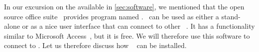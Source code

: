 %
%
%
In our excursion on the available  in \cref{sec:software}, we mentioned that the open source office suite \libreoffice\ provides program named \libreofficeBase.
\libreofficeBase\ can be used as either a stand-alone  or as a nice user interface that can connect to other ~\cite{FNFHWSKLSSGLFRSRPLJG2022BG7R1BOL7C,S2022L7PFEUU}.
It has a functionality similar to Microsoft Access~\cite{SSI2023MA2BTA,B2020HOMA2,UC2021AFD}, but it is free.
We will therefore use this software to connect to \postgresql.
Let us therefore discuss how \libreoffice~\cite{DF2024LTDF,GL2012LTSOOSSCBAFACSOL,S2022L7PFEUU} can be installed.%
%
%
%
%
\endhsection%
%

